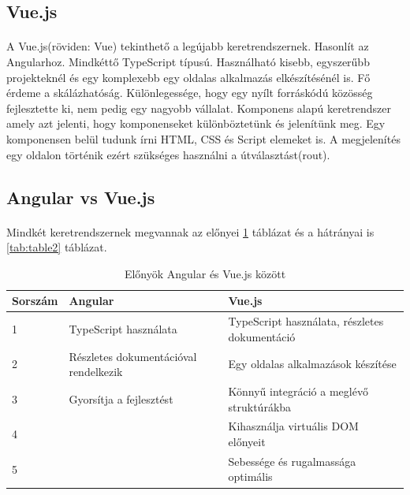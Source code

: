 	\subsection{Vue.js}
	\paragraph{}
	A Vue.js(röviden: Vue) tekinthető a legújabb keretrendszernek. Hasonlít az Angularhoz. Mindkéttő TypeScript típusú. Használható kisebb, egyszerűbb projekteknél és egy komplexebb egy oldalas alkalmazás elkészítésénél is. Fő érdeme a skálázhatóság. Különlegessége, hogy egy nyílt forráskódú közösség fejlesztette ki, nem pedig egy nagyobb vállalat. Komponens alapú keretrendszer amely azt jelenti, hogy komponenseket különböztetünk és jelenítünk meg. Egy komponensen belül tudunk írni HTML, CSS és Script elemeket is. A megjelenítés egy oldalon történik ezért szükséges használni a útválasztást(rout).\cite{wohlgethan2018supportingweb}
	
	\subsection{Angular vs Vue.js}
	\paragraph{}
	Mindkét keretrendszernek megvannak az előnyei \ref{tab:table1} táblázat és a hátrányai is \ref{tab:table2} táblázat. 
	\begin{table}[H]
	\begin{footnotesize}
		\begin{center}
			\caption{Előnyök Angular és Vue.js között \cite{vuevsang} }
			\label{tab:table1}
			\begin{tabular}{p{2cm}|p{6cm}|p{6cm}}
				\textbf{Sorszám} & \textbf{Angular} & \textbf{Vue.js}\\
				\hline
				1 & TypeScript használata & TypeScript használata, részletes dokumentáció\\
				\hline
				2 & Részletes dokumentációval rendelkezik & Egy oldalas alkalmazások készítése \\
				\hline
				3 & Gyorsítja a fejlesztést & Könnyű integráció a meglévő struktúrákba \\
				\hline
				4 & & Kihasználja virtuális DOM előnyeit \\
				\hline
				5 & & Sebessége és rugalmassága optimális \\
			\end{tabular}
		\end{center}
	\end{footnotesize}
	\end{table}


